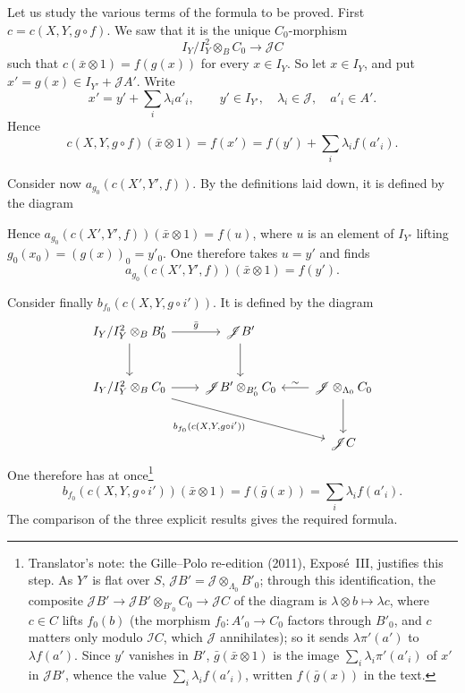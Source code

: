 \begin{center}
\end{center}

Let us study the various terms of the formula to be proved. First
\(c=c(X,Y,g\circ f)\). We saw that it is the unique \(C_0\)-morphism
\[
 I_Y/I_Y^2\otimes_B C_0\longrightarrow\mathscr J C
\]
such that \(c(\bar x\otimes1)=f(g(x))\) for every \(x\in I_Y\).
So let \(x\in I_Y\), and put \(x'=g(x)\in I_{Y'}+\mathscr J A'\). Write
\[
 x'=y'+\sum_i\lambda_i a'_i,
 \qquad y'\in I_{Y'},\quad \lambda_i\in\mathscr J,\quad a'_i\in A'.
\]
Hence
\[
 c(X,Y,g\circ f)(\bar x\otimes1)
 =f(x')=f(y')+\sum_i\lambda_i f(a'_i).
\]

Consider now \(a_{g_0}(c(X',Y',f))\). By the definitions laid down, it
is defined by the diagram

\begin{center}
\end{center}

Hence \(a_{g_0}(c(X',Y',f))(\bar x\otimes1)=f(u)\), where \(u\) is an
element of \(I_{Y'}\) lifting \(g_0(x_0)=(g(x))_0=y'_0\). One therefore
takes \(u=y'\) and finds
\[
 a_{g_0}(c(X',Y',f))(\bar x\otimes1)=f(y').
\]

Consider finally \(b_{f_0}(c(X,Y,g\circ i'))\). It is defined by the
diagram
\[
\begin{tikzcd}[column sep=2.2em,row sep=2.6em]
 I_Y/I_Y^2\otimes_BB'_0\arrow[r,"\bar g"]\arrow[d]
  &\mathscr JB'\arrow[d]&\\
 I_Y/I_Y^2\otimes_BC_0\arrow[r]
   \arrow[drr,"{b_{f_0}(c(X,Y,g\circ i'))}"']
  &\mathscr JB'\otimes_{B'_0}C_0
  &\mathscr J\otimes_{\Lambda_0}C_0\arrow[l,"\sim"']\arrow[d]\\
 &&\mathscr JC
\end{tikzcd}
\]
One therefore has at once\footnote{Translator's note: the Gille--Polo re-edition (2011), Exposé~III, justifies this
step. As \(Y'\) is flat over \(S\), \(\mathscr JB'=\mathscr J\otimes_{\Lambda_0}B'_0\);
through this identification, the composite
\(\mathscr JB'\to\mathscr JB'\otimes_{B'_0}C_0\to\mathscr JC\) of the diagram is
\(\lambda\otimes b\mapsto\lambda c\), where \(c\in C\) lifts \(f_0(b)\) (the
morphism \(f_0\colon A'_0\to C_0\) factors through \(B'_0\), and \(c\) matters
only modulo \(\mathscr IC\), which \(\mathscr J\) annihilates); so it sends
\(\lambda\pi'(a')\) to \(\lambda f(a')\). Since \(y'\) vanishes in \(B'\),
\(\bar g(\bar x\otimes1)\) is the image \(\sum_i\lambda_i\pi'(a'_i)\) of \(x'\)
in \(\mathscr JB'\), whence the value \(\sum_i\lambda_if(a'_i)\), written
\(f(\bar g(x))\) in the text.}
\[
 b_{f_0}(c(X,Y,g\circ i'))(\bar x\otimes1)=f(\bar g(x))
 =\sum_i\lambda_i f(a'_i).
\]
The comparison of the three explicit results gives the required formula.

